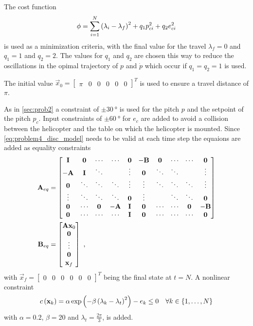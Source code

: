 The cost function 
\begin{equation}
\phi=\sum_{i=1}^{N}\left(\lambda_i-\lambda_f\right)^2+q_1p_{ci}^2+q_2e_{ci}^2
\end{equation}
is used as a minimization criteria, with the final value for the travel $\lambda_f=0$ and $q_1=1$ and $q_2=2$. The values for $q_1$ and $q_2$ are chosen this way to reduce the oscillations in the opimal trajectory of $p$ and $\dot{p}$ which occur if $q_1=q_2=1$ is used.

The initial value $\vec{x}_0=\begin{bmatrix}\pi & 0 & 0 & 0 & 0 & 0\end{bmatrix}^T$ is used to ensure a travel distance of $\pi$.


As in \cref{sec:prob2} a constraint of $\pm\SI{30}{\degree}$ is used for the pitch $p$ and the setpoint of the pitch $p_c$. Input constraints of $\pm\SI{60}{\degree}$ for $e_c$ are added to avoid a collision between the helicopter and the table on which the helicopter is mounted. Since \eqref{eq:problem4_disc_model} needs to be valid at each time step the equaions are added as equality constraints
\begin{subequations}
	\begin{align}
	\mathbf{A}_{eq}&=\begin{bmatrix}
	\mathbf{I} & \mathbf{0} & \cdots & \cdots & \mathbf{0} & -\mathbf{B} & \mathbf{0} & \cdots &\cdots & \mathbf{0}\\
	-\mathbf{A} & \mathbf{I} & \ddots & & \vdots & \mathbf{0} & \ddots & \ddots &  & \vdots\\
	\mathbf{0} & \ddots & \ddots & \ddots & \vdots & \vdots & \ddots & \ddots & \ddots &\vdots \\
	\vdots & \ddots & \ddots & \ddots & \mathbf{0} & \vdots &  & \ddots & \ddots &\mathbf{0} \\
	\mathbf{0} & \cdots & \mathbf{0} & -\mathbf{A} & \mathbf{I} & \mathbf{0} & \cdots & \cdots & \mathbf{0} &-\mathbf{B}\\
	\mathbf{0} & \cdots & \cdots & \cdots & \mathbf{I} & \mathbf{0} & \cdots & \cdots & \cdots & \mathbf{0}\\
	\end{bmatrix}\\
	\mathbf{B}_{eq}&=\begin{bmatrix}
	\mathbf{A}\mathbf{x}_0\\
	\mathbf{0}\\
	\vdots\\
	\mathbf{0}\\
	\mathbf{x}_f
	\end{bmatrix}\text{~,}
	\end{align}
\end{subequations}
with $\vec{x}_f=\begin{bmatrix} 0 & 0 & 0 & 0 & 0 & 0\end{bmatrix}^T$ being the final state at $t=N$. A nonlinear constraint 
\begin{equation}
c\left(\mathbf{x}_k\right)=\alpha \exp\left(-\beta\left(\lambda_k-\lambda_t\right)^2\right)-e_k\leq0 \quad \forall k\in\{1,\ldots,N\}
\end{equation}
with $\alpha=0.2$, $\beta=20$ and $\lambda_t=\frac{2\pi}{3}$, is added. 


